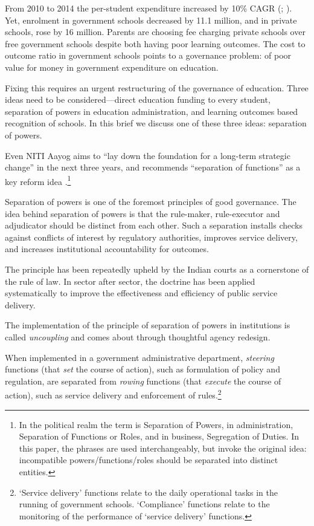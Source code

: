 \documentclass[a4paper, 12pt, twoside]{article}
\begin{document}
                  From 2010 to 2014 the per-student expenditure increased by 10\% CAGR (\cite{aibb2013-14}; \cite{cprbb2017-18}). Yet, enrolment in government schools decreased by 11.1 million, and in private schools, rose by 16 million. Parents are choosing fee charging private schools over free government schools despite both having poor learning outcomes. The cost to outcome ratio in government schools points to a governance problem: of poor value for money in government expenditure on education.

Fixing this requires an urgent restructuring of the governance of education. Three ideas need to be considered—direct education funding to every student, separation of powers in education administration, and learning outcomes based recognition of schools. In this brief we discuss one of these three ideas: separation of powers.

Even NITI Aayog aims to “lay down the foundation for a long-term strategic change” in the next three years, and recommends “separation of functions” as a key reform idea \parencite{niti3yearagenda}.\footnote{ In the political realm the term is Separation of Powers, in administration, Separation of Functions or Roles, and in business, Segregation of Duties. In this paper, the phrases are used interchangeably, but invoke the original idea: incompatible powers/functions/roles should be separated into distinct entities.}

Separation of powers is one of the foremost principles of good governance. The idea behind separation of powers is that the rule-maker, rule-executor and adjudicator should be distinct from each other. Such a separation installs checks against conflicts of interest by regulatory authorities, improves service delivery, and increases institutional accountability for outcomes. 

The principle has been repeatedly upheld by the Indian courts as a cornerstone of the rule of law. In sector after sector, the doctrine has been applied systematically to improve the effectiveness and efficiency of public service delivery.

The implementation of the principle of separation of powers in institutions is called \textit{uncoupling} and comes about through thoughtful agency redesign.

When implemented in a government administrative department, \textit{steering} functions (that \textit{set} the course of action), such as formulation of policy and regulation, are separated from \textit{rowing} functions (that \textit{execute} the course of action), such as service delivery and enforcement of rules.\footnote{‘Service delivery’ functions relate to the daily operational tasks in the running of government schools. ‘Compliance’ functions relate to the monitoring of the performance of ‘service delivery’ functions.} 
\end{document}
